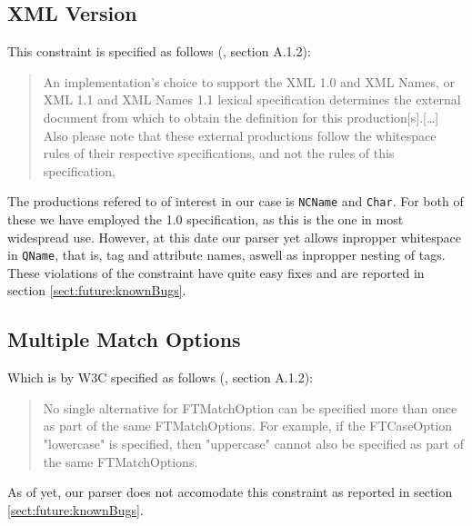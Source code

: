 \subsection{XML Version}
\label{sect:implementation:xmlVersion}
This constraint is specified as follows (\cite{w3c00}, section A.1.2):
\begin{quote}
An implementation's choice to support the XML 1.0 and XML Names, or XML 1.1 and XML Names 1.1 lexical specification determines the external document from which to obtain the definition for this production[s].[\ldots] Also please note that these external productions follow the whitespace rules of their respective specifications, and not the rules of this specification,
\end{quote}

The productions refered to of interest in our case is \verb!NCName! and \verb!Char!. For both of these we have employed the 1.0 specification, as this is the one in most widespread use. However, at this date our parser yet allows inpropper whitespace in \verb!QName!, that is, tag and attribute names, aswell as inpropper nesting of tags. These violations of the constraint have quite easy fixes and are reported in section \ref{sect:future:knownBugs}.

\subsection{Multiple Match Options}
\label{sect:implementation:multipleMatchOptions}
Which is by W3C specified as follows (\cite{w3c00}, section A.1.2):
\begin{quote}
No single alternative for FTMatchOption can be specified more than once as part of the same FTMatchOptions. For example, if the FTCaseOption "lowercase" is specified, then "uppercase" cannot also be specified as part of the same FTMatchOptions.
\end{quote}

As of yet, our parser does not accomodate this constraint as reported in section \ref{sect:future:knownBugs}.

